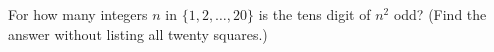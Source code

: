 For how many integers $n$ in $\{1,2,\dots,20\}$ is the tens digit of $n^2$ odd? (Find the answer without listing all twenty squares.)

